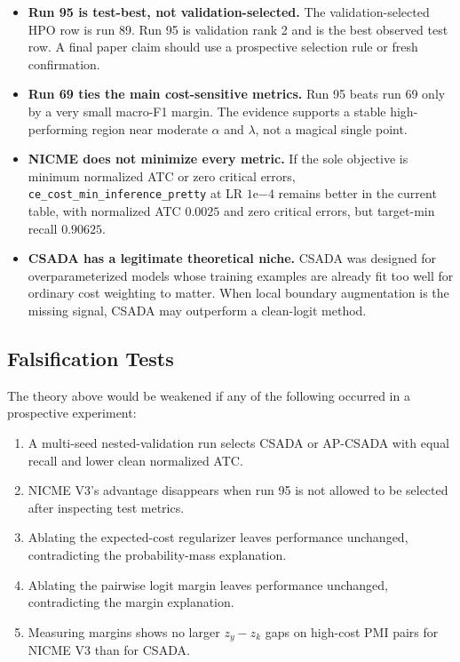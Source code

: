 \documentclass[11pt]{article}
\newcommand{\code}[1]{\texttt{#1}}
\theoremstyle{definition}
\theoremstyle{plain}
\theoremstyle{remark}
\begin{document}
\begin{itemize}
  \item \textbf{Run 95 is test-best, not validation-selected.}
  The validation-selected HPO row is run 89.
  Run 95 is validation rank 2 and is the best observed test row.
  A final paper claim should use a prospective selection rule or fresh confirmation.
  \item \textbf{Run 69 ties the main cost-sensitive metrics.}
  Run 95 beats run 69 only by a very small macro-F1 margin.
  The evidence supports a stable high-performing region near moderate $\alpha$ and $\lambda$, not a magical single point.
  \item \textbf{NICME does not minimize every metric.}
  If the sole objective is minimum normalized ATC or zero critical errors, \code{ce\_cost\_min\_inference\_pretty} at LR $1\mathrm{e}{-4}$ remains better in the current table, with normalized ATC $0.0025$ and zero critical errors, but target-min recall $0.90625$.
  \item \textbf{CSADA has a legitimate theoretical niche.}
  CSADA was designed for overparameterized models whose training examples are already fit too well for ordinary cost weighting to matter.
  When local boundary augmentation is the missing signal, CSADA may outperform a clean-logit method.
\end{itemize}

\subsection{Falsification Tests}

The theory above would be weakened if any of the following occurred in a prospective experiment:

\begin{enumerate}
  \item A multi-seed nested-validation run selects CSADA or AP-CSADA with equal recall and lower clean normalized ATC.
  \item NICME V3's advantage disappears when run 95 is not allowed to be selected after inspecting test metrics.
  \item Ablating the expected-cost regularizer leaves performance unchanged, contradicting the probability-mass explanation.
  \item Ablating the pairwise logit margin leaves performance unchanged, contradicting the margin explanation.
  \item Measuring margins shows no larger $z_y-z_k$ gaps on high-cost PMI pairs for NICME V3 than for CSADA.
\end{enumerate}
\end{document}

